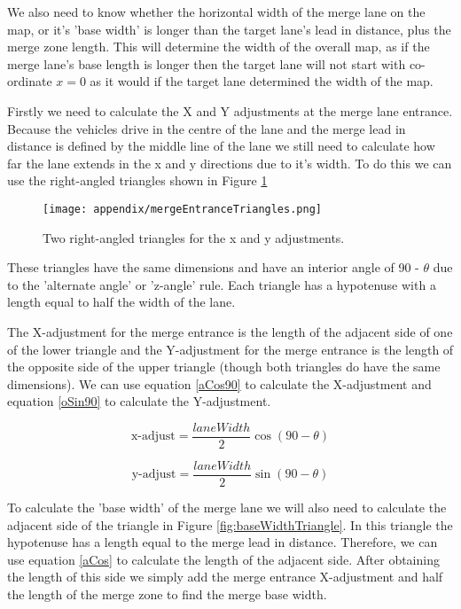 \begin{appendices}
We also need to know whether the horizontal width of the merge lane on the map, or it's 'base width' is longer than the target lane's lead in distance, plus the merge zone length. This will determine the width of the overall map, as if the merge lane's base length is longer then the target lane will not start with co-ordinate $x=0$ as it would if the target lane determined the width of the map.

Firstly we need to calculate the X and Y adjustments at the merge lane entrance. Because the vehicles drive in the centre of the lane and the merge lead in distance is defined by the middle line of the lane we still need to calculate how far the lane extends in the x and y directions due to it's width. To do this we can use the right-angled triangles shown in Figure \ref{fig:mergeEntranceTriangles}

\begin{figure}[htb]
\centering
\texttt{[image: appendix/mergeEntranceTriangles.png]}
\caption{Two right-angled triangles for the x and y adjustments.}
\label{fig:mergeEntranceTriangles}
\end{figure}

These triangles have the same dimensions and have an interior angle of 90 - $\theta$ due to the 'alternate angle' or 'z-angle' rule. Each triangle has a hypotenuse with a length equal to half the width of the lane. 

The X-adjustment for the merge entrance is the length of the adjacent side of one of the lower triangle and the Y-adjustment for the merge entrance is the length of the opposite side of the upper triangle (though both triangles do have the same dimensions). We can use equation \ref{aCos90} to calculate the X-adjustment and equation \ref{oSin90} to calculate the Y-adjustment.

\begin{equation}\label{aCos90}
\text{x-adjust} = \frac{laneWidth}{2} \cos(90 - \theta)
\end{equation}

\begin{equation}\label{oSin90}
\text{y-adjust} = \frac{laneWidth}{2} \sin(90 - \theta)
\end{equation}

To calculate the 'base width' of the merge lane we will also need to calculate the adjacent side of the triangle in Figure \ref{fig:baseWidthTriangle}. In this triangle the hypotenuse has a length equal to the merge lead in distance. Therefore, we can use equation \ref{aCos} to calculate the length of the adjacent side. After obtaining the length of this side we simply add the merge entrance X-adjustment and half the length of the merge zone to find the merge base width.


\end{appendices}
